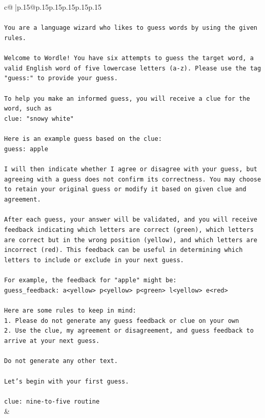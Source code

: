 \documentclass{article}
\begin{document}
{\begin{supertabular}{c@{$\;$}|p{.15\linewidth}@{}p{.15\linewidth}p{.15\linewidth}p{.15\linewidth}p{.15\linewidth}p{.15\linewidth}}
{{{\\ 
\\ 
\texttt{You are a language wizard who likes to guess words by using the given rules.} \\
\\ 
\texttt{Welcome to Wordle! You have six attempts to guess the target word, a valid English word of five lowercase letters (a{-}z). Please use the tag "guess:" to provide your guess.} \\
\\ 
\texttt{To help you make an informed guess, you will receive a clue for the word, such as} \\
\texttt{clue: "snowy white"} \\
\\ 
\texttt{Here is an example guess based on the clue: } \\
\texttt{guess: apple} \\
\\ 
\texttt{I will then indicate whether I agree or disagree with your guess, but agreeing with a guess does not confirm its correctness. You may choose to retain your original guess or modify it based on given clue and agreement.} \\
\\ 
\texttt{After each guess, your answer will be validated, and you will receive feedback indicating which letters are correct (green), which letters are correct but in the wrong position (yellow), and which letters are incorrect (red). This feedback can be useful in determining which letters to include or exclude in your next guess.} \\
\\ 
\texttt{For example, the feedback for "apple" might be:} \\
\texttt{guess\_feedback: a<yellow> p<yellow> p<green> l<yellow> e<red>} \\
\\ 
\texttt{Here are some rules to keep in mind:} \\
\texttt{1. Please do not generate any guess feedback or clue on your own} \\
\texttt{2. Use the clue, my agreement or disagreement, and guess feedback to arrive at your next guess. } \\
\\ 
\texttt{Do not generate any other text.} \\
\\ 
\texttt{Let's begin with your first guess.} \\
\\ 
\texttt{clue: nine{-}to{-}five routine} \\
            }
        }
    }
    & \\ \\


\end{supertabular}}
\end{document}
